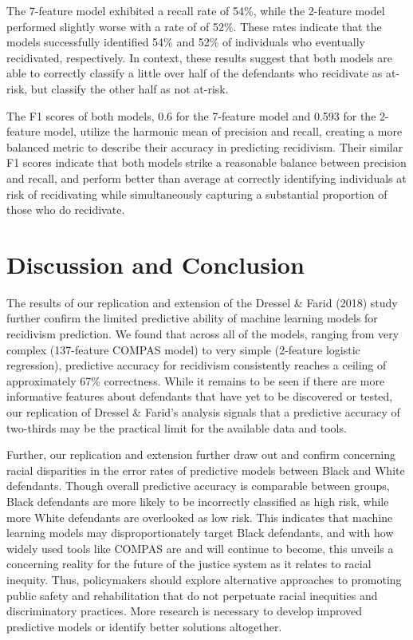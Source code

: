 \documentclass[12pt, ]{article}
\begin{document}
The 7-feature model exhibited a recall rate of 54\%, while the 2-feature
model performed slightly worse with a rate of of 52\%. These rates
indicate that the models successfully identified 54\% and 52\% of
individuals who eventually recidivated, respectively. In context, these
results suggest that both models are able to correctly classify a little
over half of the defendants who recidivate as at-risk, but classify the
other half as not at-risk.

The F1 scores of both models, 0.6 for the 7-feature model and 0.593 for
the 2-feature model, utilize the harmonic mean of precision and recall,
creating a more balanced metric to describe their accuracy in predicting
recidivism. Their similar F1 scores indicate that both models strike a
reasonable balance between precision and recall, and perform better than
average at correctly identifying individuals at risk of recidivating
while simultaneously capturing a substantial proportion of those who do
recidivate.

\hypertarget{discussion-and-conclusion}{%
\section{Discussion and Conclusion}\label{discussion-and-conclusion}}

The results of our replication and extension of the Dressel \& Farid
(2018) study further confirm the limited predictive ability of machine
learning models for recidivism prediction. We found that across all of
the models, ranging from very complex (137-feature COMPAS model) to very
simple (2-feature logistic regression), predictive accuracy for
recidivism consistently reaches a ceiling of approximately 67\%
correctness. While it remains to be seen if there are more informative
features about defendants that have yet to be discovered or tested, our
replication of Dressel \& Farid's analysis signals that a predictive
accuracy of two-thirds may be the practical limit for the available data
and tools.

Further, our replication and extension further draw out and confirm
concerning racial disparities in the error rates of predictive models
between Black and White defendants. Though overall predictive accuracy
is comparable between groups, Black defendants are more likely to be
incorrectly classified as high risk, while more White defendants are
overlooked as low risk. This indicates that machine learning models may
disproportionately target Black defendants, and with how widely used
tools like COMPAS are and will continue to become, this unveils a
concerning reality for the future of the justice system as it relates to
racial inequity. Thus, policymakers should explore alternative
approaches to promoting public safety and rehabilitation that do not
perpetuate racial inequities and discriminatory practices. More research
is necessary to develop improved predictive models or identify better
solutions altogether.
\end{document}
